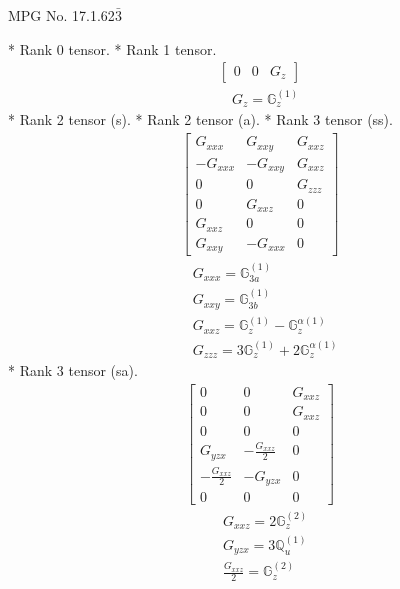 \documentclass[fleqn,8pt,landscape]{jsarticle}
\begin{document}
\setcounter{MaxMatrixCols}{32}

\renewcommand{\tablename}{Table~}
\renewcommand{\figurename}{Figure~}
\begin{center}
\LARGE
MPG No. 17.1.62\quad$\bar{3}$
\end{center}
* Rank 0 tensor.
* Rank 1 tensor.
\begin{align*}
\begin{bmatrix} 0 & 0 & G_{z} \end{bmatrix}
\end{align*}
\begin{align*}
& G_{z} = \mathbb{G}_{z}^{(1)}
\end{align*}
* Rank 2 tensor (s).
* Rank 2 tensor (a).
* Rank 3 tensor (ss).
\begin{align*}
\begin{bmatrix} G_{xxx} & G_{xxy} & G_{xxz} \\ - G_{xxx} & - G_{xxy} & G_{xxz} \\ 0 & 0 & G_{zzz} \\ 0 & G_{xxz} & 0 \\ G_{xxz} & 0 & 0 \\ G_{xxy} & - G_{xxx} & 0 \end{bmatrix}
\end{align*}
\begin{align*}
& G_{xxx} = \mathbb{G}_{3a}^{(1)} \\
& G_{xxy} = \mathbb{G}_{3b}^{(1)} \\
& G_{xxz} = \mathbb{G}_{z}^{(1)} - \mathbb{G}_{z}^{\alpha(1)} \\
& G_{zzz} = 3 \mathbb{G}_{z}^{(1)} + 2 \mathbb{G}_{z}^{\alpha(1)}
\end{align*}
* Rank 3 tensor (sa).
\begin{align*}
\begin{bmatrix} 0 & 0 & G_{xxz} \\ 0 & 0 & G_{xxz} \\ 0 & 0 & 0 \\ G_{yzx} & - \frac{G_{xxz}}{2} & 0 \\ - \frac{G_{xxz}}{2} & - G_{yzx} & 0 \\ 0 & 0 & 0 \end{bmatrix}
\end{align*}
\begin{align*}
& G_{xxz} = 2 \mathbb{G}_{z}^{(2)} \\
& G_{yzx} = 3 \mathbb{Q}_{u}^{(1)} \\
& \frac{G_{xxz}}{2} = \mathbb{G}_{z}^{(2)}
\end{align*}
\end{document}

